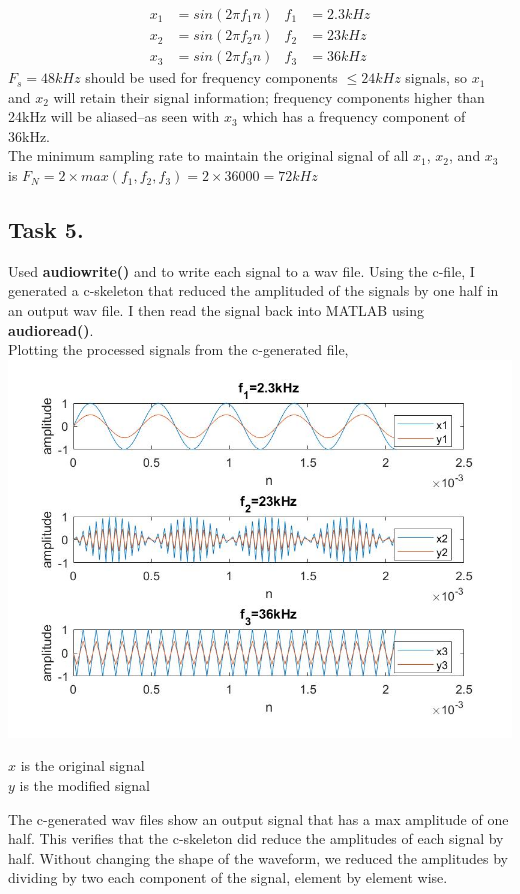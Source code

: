 \documentclass{article}
\begin{document}
        \begin{align*}
            x_1&=sin(2 \pi f_1 n) & f_1&=2.3kHz\\
            x_2&=sin(2 \pi f_2 n) & f_2&=23kHz\\
            x_3&=sin(2 \pi f_3 n) & f_3&=36kHz
        \end{align*}
        $F_s=48kHz$ should be used for frequency components $\leq 24kHz$ signals, so $x_1$ and $x_2$ will retain their signal information; frequency components higher than 24kHz will be aliased--as seen with $x_3$ which has a frequency component of 36kHz.\\
        \vspace{5mm}
        The minimum sampling rate to maintain the original signal of all $x_1$, $x_2$, and $x_3$ is $F_N=2\times max(f_1,f_2,f_3)=2 \times 36000=72kHz$
        
    \subsection{Task 5.}
        Used \textbf{audiowrite()} and to write each signal to a wav file. Using the c-file, I generated a c-skeleton that reduced the amplituded of the signals by one half in an output wav file. I then read the signal back into MATLAB using \textbf{audioread()}.\\
        \vspace{5mm}
        Plotting the processed signals from the c-generated file,
        \includegraphics[width=\textwidth]{task5.jpg}
        \begin{center}
            $x$ is the original signal\\
            $y$ is the modified signal
        \end{center}
        The c-generated wav files show an output signal that has a max amplitude of one half. This verifies that the c-skeleton did reduce the amplitudes of each signal by half. Without changing the shape of the waveform, we reduced the amplitudes by dividing by two each component of the signal, element by element wise.
\newpage
\end{document}

